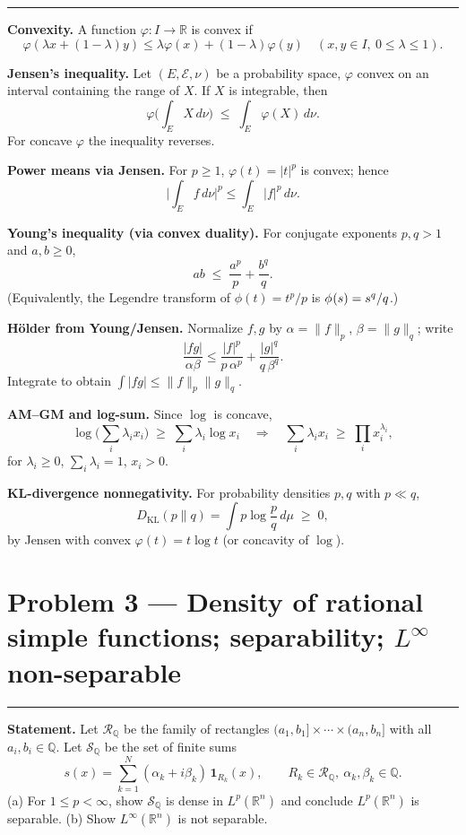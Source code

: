 \documentclass[12pt,a4paper]{article}
\theoremstyle{plain}
\theoremstyle{definition}
\theoremstyle{remark}
\theoremstyle{remark}
\newcommand{\tighthrule}{\vspace{0.6\baselineskip}\hrule\vspace{0.8\baselineskip}}
\newenvironment{spacy}{\begingroup\setlength{\parskip}{6pt}\setlength{\parindent}{0pt}}{\endgroup}
\theoremstyle{definition}
\begin{document}
\tighthrule
\begin{spacy}
	\textbf{Convexity.}
	A function $\varphi:I\to\mathbb R$ is convex if
	\[
	\varphi(\lambda x+(1-\lambda)y)\le \lambda\varphi(x)+(1-\lambda)\varphi(y)
	\quad (x,y\in I,\ 0\le\lambda\le1).
	\]
	
	\textbf{Jensen's inequality.}
	Let $(E,\mathcal E,\nu)$ be a probability space, $\varphi$ convex on an interval containing the range of $X$.
	If $X$ is integrable, then
	\[
	\varphi\!\Big(\int_E X\,d\nu\Big) \;\le\; \int_E \varphi(X)\,d\nu.
	\]
	For concave $\varphi$ the inequality reverses.
	
	\textbf{Power means via Jensen.}
	For $p\ge 1$, $\varphi(t)=|t|^{p}$ is convex; hence
	\[
	\Big|\int_E f\,d\nu\Big|^{p}\le \int_E |f|^{p}\,d\nu.
	\]
	
	\textbf{Young's inequality (via convex duality).}
	For conjugate exponents $p,q>1$ and $a,b\ge0$,
	\[
	ab \;\le\; \frac{a^{p}}{p}+\frac{b^{q}}{q}.
	\]
	(Equivalently, the Legendre transform of $\phi(t)=t^{p}/p$ is $\phi^{\*}(s)=s^{q}/q$.)
	
	\textbf{Hölder from Young/Jensen.}
	Normalize $f,g$ by $\alpha=\|f\|_{p}$, $\beta=\|g\|_{q}$; write
	\[
	\frac{|fg|}{\alpha\beta}
	\le \frac{|f|^{p}}{p\,\alpha^{p}} + \frac{|g|^{q}}{q\,\beta^{q}}.
	\]
	Integrate to obtain
	$\int |fg|\le \|f\|_{p}\|g\|_{q}$.
	
	\textbf{AM--GM and log-sum.}
	Since $\log$ is concave,
	\[
	\log\!\Big(\sum_{i} \lambda_i x_i\Big) \;\ge\; \sum_i \lambda_i \log x_i
	\quad\Rightarrow\quad
	\sum_i \lambda_i x_i \;\ge\; \prod_i x_i^{\lambda_i},
	\]
	for $\lambda_i\ge0$, $\sum_i\lambda_i=1$, $x_i>0$.
	
	\textbf{KL-divergence nonnegativity.}
	For probability densities $p,q$ with $p\ll q$,
	\[
	D_{\mathrm{KL}}(p\|q)=\int p\log\frac{p}{q}\,d\mu \;\ge\; 0,
	\]
	by Jensen with convex $\varphi(t)=t\log t$ (or concavity of $\log$).
	
\end{spacy}

\section*{Problem 3 — Density of rational simple functions; separability; $L^\infty$ non-separable}

\tighthrule
\begin{spacy}
	\textbf{Statement.}
	Let $\mathcal R_{\mathbb Q}$ be the family of rectangles $(a_1,b_1]\times\cdots\times(a_n,b_n]$ with all $a_i,b_i\in\mathbb Q$.
	Let $\mathcal S_{\mathbb Q}$ be the set of finite sums
	\[
	s(x)=\sum_{k=1}^{N}(\alpha_k+i\beta_k)\,\mathbf 1_{R_k}(x),
	\qquad R_k\in\mathcal R_{\mathbb Q},\ \alpha_k,\beta_k\in\mathbb Q.
	\]
	(a) For $1\le p<\infty$, show $\mathcal S_{\mathbb Q}$ is dense in $L^p(\mathbb R^n)$ and conclude $L^p(\mathbb R^n)$ is separable.
	(b) Show $L^\infty(\mathbb R^n)$ is not separable.
\end{spacy}
\end{document}
